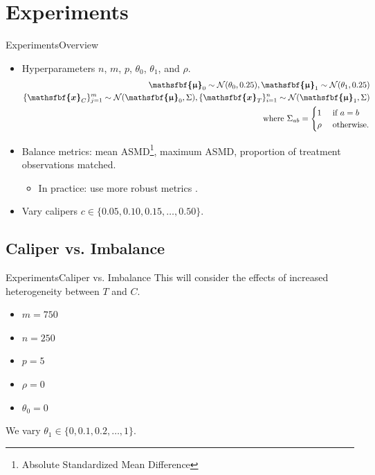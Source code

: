 \documentclass[11pt, compress]{beamer}
\renewcommand{\vec}[1]{\ensuremath{\boldsymbol{\mathsfbf{#1}}}}
\begin{document}
\section{Experiments}
\begin{frame}{Experiments}{Overview}
	\begin{itemize}
		\item Hyperparameters $n$, $m$, $p$, $\theta_0$, $\theta_1$, and $\rho$.
	\begin{align}
		\vec{\upmu}_0 \sim \mathcal N(\theta_0, 0.25), \vec{\upmu}_1 \sim \mathcal N(\theta_1, 0.25) \\
		\{\vec{x}_C\}_{j=1}^{m} \sim \mathcal N(\vec{\upmu}_0, \Sigma), \{\vec{x}_T\}_{i=1}^{n} \sim \mathcal N(\vec{\upmu}_1, \Sigma) \\
		\text{ where } \Sigma_{a b} = \begin{cases}
			1 & \text{ if } a = b \\
			\rho & \text{ otherwise.}
		\end{cases}
	\end{align}
		\item Balance metrics: mean ASMD\footnote{Absolute Standardized Mean Difference}, maximum ASMD, proportion of treatment observations matched.
		\begin{itemize}
			\item In practice: use more robust metrics \parencite{basu_use_2008, zhu_kernel-based_2018}.
		\end{itemize}
		\item Vary calipers $c \in \{0.05, 0.10, 0.15, \ldots, 0.50\}$.
	\end{itemize}
\end{frame}


\subsection{Caliper vs. Imbalance}
\begin{frame}{Experiments}{Caliper vs. Imbalance}
	This will consider the effects of increased heterogeneity between $T$ and $C$.
	\begin{itemize}
		\item $m = 750$
		\item $n = 250$
		\item $p = 5$
		\item $\rho = 0$
		\item $\theta_0 = 0$
	\end{itemize}
	We vary $\theta_1 \in \{0, 0.1, 0.2, \ldots, 1\}$.
\end{frame}
\end{document}
